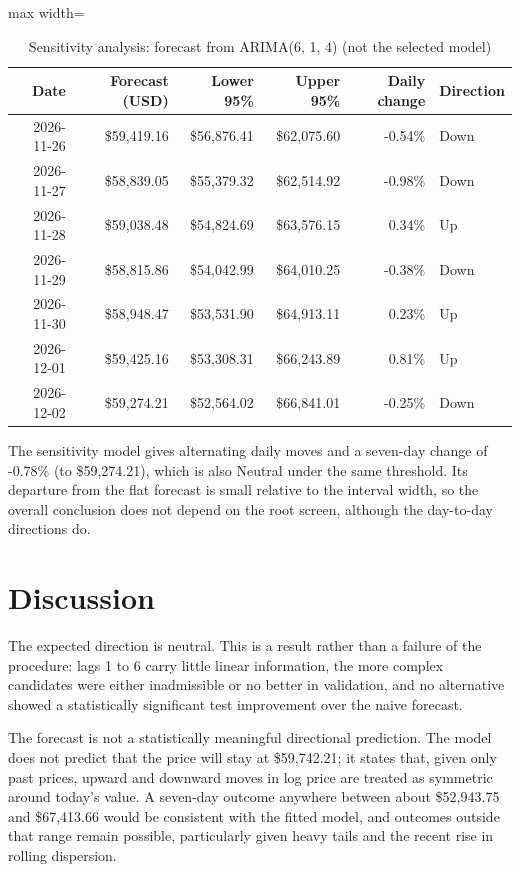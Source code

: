 \documentclass[11pt,a4paper]{article}
\begin{document}
\begin{table}[H]
\centering
\caption{Sensitivity analysis: forecast from ARIMA(6, 1, 4) (not the selected model)}
\footnotesize
\setlength{\tabcolsep}{4pt}
\begin{adjustbox}{max width=\linewidth}
\begin{tabular}{rrrrrl}
\toprule
\textbf{Date} & \textbf{Forecast (USD)} & \textbf{Lower 95\%} & \textbf{Upper 95\%} & \textbf{Daily change} & \textbf{Direction} \\
\midrule
2026-11-26 & \$59,419.16 & \$56,876.41 & \$62,075.60 & -0.54\% & Down \\
2026-11-27 & \$58,839.05 & \$55,379.32 & \$62,514.92 & -0.98\% & Down \\
2026-11-28 & \$59,038.48 & \$54,824.69 & \$63,576.15 & 0.34\% & Up \\
2026-11-29 & \$58,815.86 & \$54,042.99 & \$64,010.25 & -0.38\% & Down \\
2026-11-30 & \$58,948.47 & \$53,531.90 & \$64,913.11 & 0.23\% & Up \\
2026-12-01 & \$59,425.16 & \$53,308.31 & \$66,243.89 & 0.81\% & Up \\
2026-12-02 & \$59,274.21 & \$52,564.02 & \$66,841.01 & -0.25\% & Down \\
\bottomrule
\end{tabular}
\end{adjustbox}
\end{table}

The sensitivity model gives alternating daily moves and a seven-day change of -0.78\% (to \$59,274.21), which is also Neutral under the same threshold. Its departure from the flat forecast is small relative to the interval width, so the overall conclusion does not depend on the root screen, although the day-to-day directions do.

\section{Discussion}

The expected direction is neutral. This is a result rather than a failure of the procedure: lags 1 to 6 carry little linear information, the more complex candidates were either inadmissible or no better in validation, and no alternative showed a statistically significant test improvement over the naive forecast.

The forecast is not a statistically meaningful directional prediction. The model does not predict that the price will stay at \$59,742.21; it states that, given only past prices, upward and downward moves in log price are treated as symmetric around today's value. A seven-day outcome anywhere between about \$52,943.75 and \$67,413.66 would be consistent with the fitted model, and outcomes outside that range remain possible, particularly given heavy tails and the recent rise in rolling dispersion.
\end{document}
